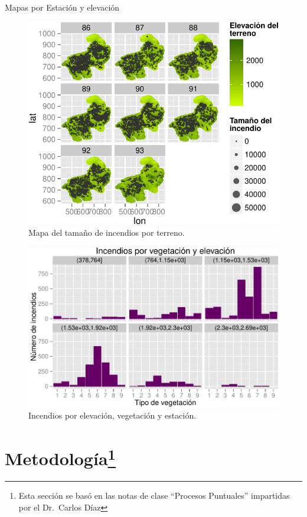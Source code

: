 \documentclass[12,]{article}
\let\rmarkdownfootnote\footnote%
\def\footnote{\protect\rmarkdownfootnote}
\begin{document}
Mapas por Estación y elevación

\begin{figure}[htbp]
\centering
\includegraphics{tarea2_files/figure-latex/unnamed-chunk-6-1.pdf}
\caption{Mapa del tamaño de incendios por terreno.}
\end{figure}

\begin{figure}[htbp]
\centering
\includegraphics{tarea2_files/figure-latex/unnamed-chunk-7-1.pdf}
\caption{Incendios por elevación, vegetación y estación.}
\end{figure}

\section[Metodología]{Metodología\footnote{Esta sección se basó en las
  notas de clase ``Procesos Puntuales'' impartidas por el Dr.~Carlos
  Díaz}}\label{metodologia}
\end{document}
